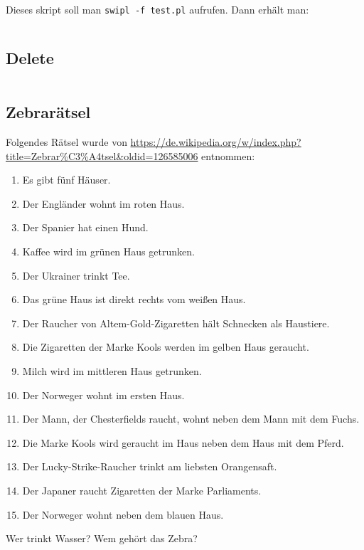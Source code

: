 Dieses skript soll man \texttt{swipl -f test.pl} aufrufen. Dann erhält man:

\inputminted[numbersep=5pt, tabsize=4]{prolog}{scripts/prolog/splits.sh}

\subsection{Delete}%
\inputminted[numbersep=5pt, tabsize=4]{prolog}{scripts/prolog/delete.pl}

\subsection{Zebrarätsel}
Folgendes Rätsel wurde von \url{https://de.wikipedia.org/w/index.php?title=Zebrar%C3%A4tsel&oldid=126585006}
entnommen:

\begin{enumerate}
    \item Es gibt fünf Häuser.
    \item Der Engländer wohnt im roten Haus.
    \item Der Spanier hat einen Hund.
    \item Kaffee wird im grünen Haus getrunken.
    \item Der Ukrainer trinkt Tee.
    \item Das grüne Haus ist direkt rechts vom weißen Haus.
    \item Der Raucher von Altem-Gold-Zigaretten hält Schnecken als Haustiere.
    \item Die Zigaretten der Marke Kools werden im gelben Haus geraucht.
    \item Milch wird im mittleren Haus getrunken.
    \item Der Norweger wohnt im ersten Haus.
    \item Der Mann, der Chesterfields raucht, wohnt neben dem Mann mit dem Fuchs.
    \item Die Marke Kools wird geraucht im Haus neben dem Haus mit dem Pferd.
    \item Der Lucky-Strike-Raucher trinkt am liebsten Orangensaft.
    \item Der Japaner raucht Zigaretten der Marke Parliaments.
    \item Der Norweger wohnt neben dem blauen Haus.
\end{enumerate}

Wer trinkt Wasser? Wem gehört das Zebra?

\inputminted[linenos, numbersep=5pt, tabsize=4, frame=lines, label=zebraraetsel.pro]{prolog}{scripts/prolog/zebraraetsel.pro}

